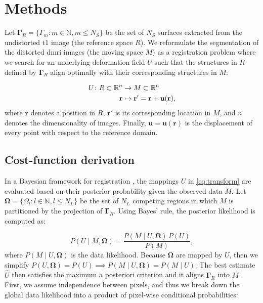 \documentclass[3p,authoryear,fleqn]{elsarticle}
\providecommand{\omegaset}{\ensuremath{\boldsymbol{\Omega}}}
\providecommand{\gammaset}{\ensuremath{\boldsymbol{\Gamma}}}
\renewcommand{\vec}[1]{\mathbf{#1}}
\begin{document}
\makeatletter{}\section{Methods}
\label{sec:methods}
Let $\gammaset_R = \{\Gamma_m: m \in \mathbb{N}, m \leq N_S\}$ be the set of $N_S$ surfaces
  extracted from the undistorted \gls*{t1} image (the reference space $R$).
We reformulate the segmentation of the distorted \gls*{dmri} images (the moving space $M$)
  as a registration problem where we search for an underlying deformation field $U$ such that 
  the structures in $R$ defined by $\gammaset_R$ align optimally with their corresponding
  structures in $M$:

  \begin{align}
  U\colon R \subset \mathbb{R}^n &\to M \subset \mathbb{R}^n \notag\\
  \vec{r} &\mapsto \vec{r}' =\vec{r}+\vec{u}(\vec{r}),
  \label{eq:transform}
  \end{align}
  where $\vec{r}$ denotes a position in $R$, $\vec{r}'$ is
  its corresponding location in $M$, and $n$ denotes the dimensionality of images.
Finally, $\vec{u} = \vec{u}(\vec{r})$ is the displacement of every point with respect
  to the reference domain.

\subsection{Cost-function derivation}\label{sec:methods_map}
In a Bayesian framework for registration \citep{wyatt_map_2003,pohl_bayesian_2006,gass_simultaneous_2014},
  the mappings $U$ in \eqref{eq:transform} are
  evaluated based on their posterior probability given the observed data
  $M$.
Let $\omegaset = \{\Omega_l: l \in \mathbb{N}, l \leq N_L\}$ be the set of $N_L$ competing regions in
  which $M$ is partitioned by the projection of $\gammaset_R$.
Using Bayes' rule, the posterior likelihood is computed as:

  \begin{equation}
  P(U \mid M, \omegaset ) = \frac{P(M \mid U,\omegaset )\, P(U)}{P(M)},
  \label{eq:bayes_rule}
  \end{equation}
  where $P(M \mid U,\omegaset)$ is the data likelihood.
Because $\omegaset$ are mapped by $U$, then we simplify
  $P(U, \omegaset) = P(U) \implies P(M \mid U,\omegaset) = P(M \mid U)$.
The best estimate $\hat{U}$ then satisfies the maximum a posteriori criterion
  \citep{bishop_pattern_2006} and it aligns $\gammaset_R$ into $M$.
First, we assume independence between pixels, and thus we break down the
  global data likelihood into a product of pixel-wise conditional probabilities:
\end{document}
